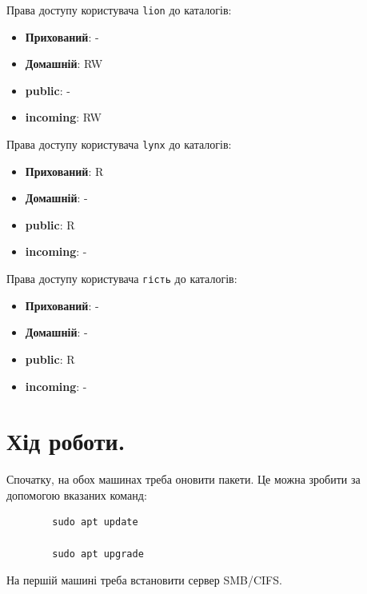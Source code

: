 \documentclass[14pt, a4paper]{extreport}
\begin{document}
	Права доступу користувача \texttt{lion} до каталогів:
	
	\begin{itemize}
		\item \textbf{Прихований}: -
		
		\item \textbf{Домашній}: RW
		
		\item \textbf{public}: -
		
		\item \textbf{incoming}: RW
	\end{itemize}
	
	Права доступу користувача \texttt{lynx} до каталогів:
	
	\begin{itemize}
		\item \textbf{Прихований}: R
		
		\item \textbf{Домашній}: -
		
		\item \textbf{public}: R
		
		\item \textbf{incoming}: -
	\end{itemize}
	
	Права доступу користувача \texttt{гість} до каталогів:
	
	\begin{itemize}
		\item \textbf{Прихований}: -
		
		\item \textbf{Домашній}: -
		
		\item \textbf{public}: R
		
		\item \textbf{incoming}: -
	\end{itemize}
	
	\section*{Хід роботи.}
	
	Спочатку, на обох машинах треба оновити пакети. Це можна зробити за допомогою вказаних команд: \sideat{[VM 1, 2]}
	
	\begin{verbatim}
		sudo apt update
		
		sudo apt upgrade
	\end{verbatim}
	
	На першій машині треба встановити сервер SMB/CIFS. \sideat{[VM 1]}
	
\end{document}
